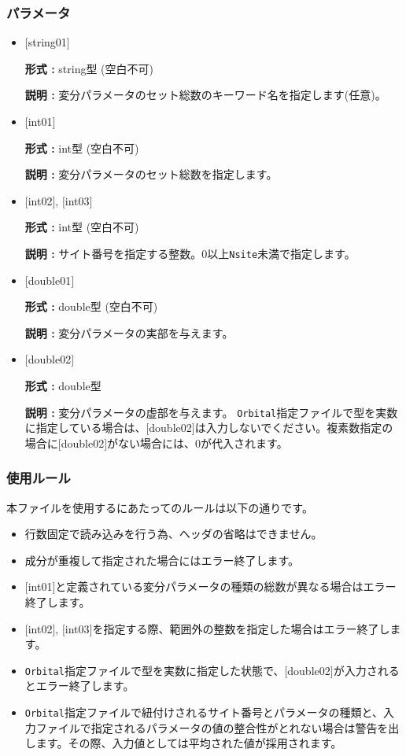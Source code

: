 \subsubsection{パラメータ}
 \begin{itemize}

   \item  $[$string01$]$
   
    {\bf 形式 :} string型 (空白不可)

   {\bf 説明 :} 変分パラメータのセット総数のキーワード名を指定します(任意)。

   \item  $[$int01$]$
   
    {\bf 形式 :} int型 (空白不可)

   {\bf 説明 :} 変分パラメータのセット総数を指定します。

  \item  $[$int02$]$, $[$int03$]$
   
 {\bf 形式 :} int型 (空白不可)

{\bf 説明 :} サイト番号を指定する整数。0以上\verb|Nsite|{未満}で指定します。
 
  \item  $[$double01$]$
    
   {\bf 形式 :} double型 (空白不可)

  {\bf 説明 :} 変分パラメータの実部を与えます。
  
 
 \item $[$double02$]$
   
   {\bf 形式 :} double型

  {\bf 説明 :} 変分パラメータの虚部を与えます。 \verb|Orbital|指定ファイルで型を実数に指定している場合は、$[$double02$]$は入力しないでください。複素数指定の場合に$[$double02$]$がない場合には、0が代入されます。

  
\end{itemize}

\subsubsection{使用ルール}
本ファイルを使用するにあたってのルールは以下の通りです。
\begin{itemize}
\item 行数固定で読み込みを行う為、ヘッダの省略はできません。
\item 成分が重複して指定された場合にはエラー終了します。
\item $[$int01$]$と定義されている変分パラメータの種類の総数が異なる場合はエラー終了します。
\item $[$int02$]$, $[$int03$]$を指定する際、範囲外の整数を指定した場合はエラー終了します。
\item \verb|Orbital|指定ファイルで型を実数に指定した状態で、$[$double02$]$が入力されるとエラー終了します。
\item \verb|Orbital|指定ファイルで紐付けされるサイト番号とパラメータの種類と、入力ファイルで指定されるパラメータの値の整合性がとれない場合は警告を出します。その際、入力値としては平均された値が採用されます。
\end{itemize}



